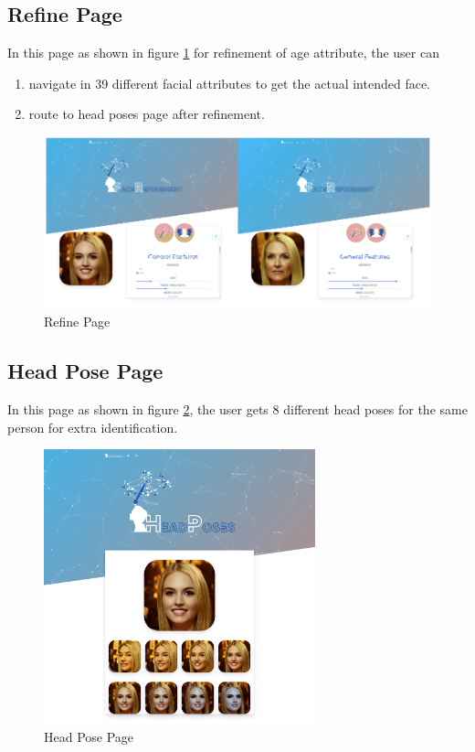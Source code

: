 \subsection{Refine Page}
In this page as shown in figure \ref{fig:user-refine} for refinement of age attribute, the user can 

\begin{enumerate}
    \item navigate in 39 different facial attributes to get the actual intended face.
    \item route to head poses page after refinement.
\end{enumerate}

\begin{figure}[H]
    \centering
    \includegraphics[width=1.0\textwidth]{images/guide/refine.png}
    \caption{Refine Page}
    \label{fig:user-refine}
\end{figure}


\subsection{Head Pose Page}
In this page as shown in figure \ref{fig:user-poses}, the user gets 8 different head poses for the same person for extra identification. 

\begin{figure}[H]
    \centering
    \includegraphics[width=0.7\textwidth]{images/guide/poses.png}
    \caption{Head Pose Page}
    \label{fig:user-poses}
\end{figure}


